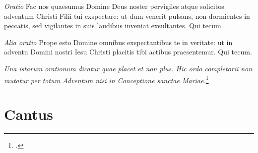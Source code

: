\documentclass[a5paper, 12pt]{book}
\newcommand{\rubrica}[1]{\textit{#1}}
\newcommand{\cantus}[1]{%
  \phantomsection
  \label{can:#1}
  }
\begin{document}
\rubrica{Oratio}
Fac nos quaesumus Domine Deus noster pervigiles atque solicitos adventum
Christi Filii tui exspectare: ut dum venerit pulsans,
non dormientes in peccatis, sed vigilantes in suis laudibus inveniat
exsultantes. Qui tecum.

\rubrica{Alia oratio}
Prope esto Domine omnibus exspectantibus te in veritate:
ut in adventu Domini nostri Iesu Christi placitis tibi actibus praesentemur.
Qui tecum.

\rubrica{Una istarum orationum dicatur quae placet et non plus.
  Hic ordo completorii non mutatur per totum Adventum
  nisi in Conceptione sanctae Mariae.}\footcite[83r-83v]{bp1502}

\section*{Cantus}

\cantus{adventus_quiventurus}

\printbibliography
\end{document}
